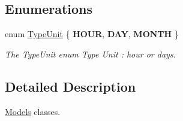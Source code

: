 \subsection*{Enumerations}
\begin{DoxyCompactItemize}
\item 
\hypertarget{namespaceModels_a999532b323a4b63ff54013326c83f040}{}enum \hyperlink{namespaceModels_a999532b323a4b63ff54013326c83f040}{Type\+Unit} \{ {\bfseries H\+O\+U\+R}, 
{\bfseries D\+A\+Y}, 
{\bfseries M\+O\+N\+T\+H}
 \}\label{namespaceModels_a999532b323a4b63ff54013326c83f040}

\begin{DoxyCompactList}\small\item\em The Type\+Unit enum Type Unit \+: hour or days. \end{DoxyCompactList}\end{DoxyCompactItemize}


\subsection{Detailed Description}
\hyperlink{namespaceModels}{Models} classes. 